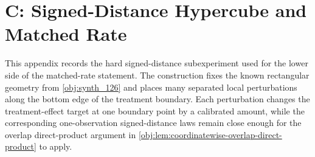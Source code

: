\section{C: Signed-Distance Hypercube and Matched Rate}
\label{sec:app-signed-hypercube}

This appendix records the hard signed-distance subexperiment used for the lower side of the matched-rate statement. The construction fixes the known rectangular geometry from \cref{obj:synth_126} and places many separated local perturbations along the bottom edge of the treatment boundary. Each perturbation changes the treatment-effect target at one boundary point by a calibrated amount, while the corresponding one-observation signed-distance laws remain close enough for the overlap direct-product argument in \cref{obj:lem:coordinatewise-overlap-direct-product} to apply.


